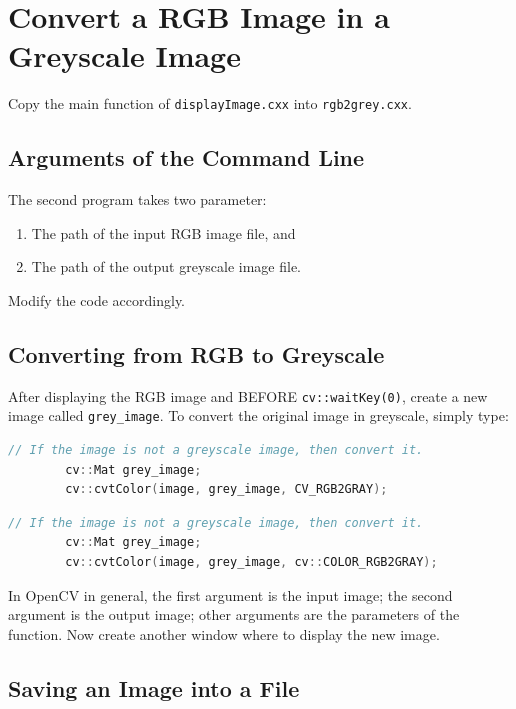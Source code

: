 \documentclass[english,a4paper,12pt,oneside]{article}
\begin{document}
\section{Convert a RGB Image in a Greyscale Image}

Copy the main function of \verb+displayImage.cxx+ into \verb+rgb2grey.cxx+.

\subsection{Arguments of the Command Line}

The second program takes two parameter:
\begin{enumerate}
 \item  The path of the input RGB image file, and
 \item  The path of the output greyscale image file.
\end{enumerate}
Modify the code accordingly. 


\subsection{Converting from RGB to Greyscale}

After displaying the RGB image and BEFORE \verb+cv::waitKey(0)+, create a new image called \verb+grey_image+. 
To convert the original image in greyscale, simply type:
\begin{lstlisting}[language=c++,caption=Convert the colour model of the image in OpenCV2 and 3.]
        // If the image is not a greyscale image, then convert it.
        cv::Mat grey_image;
        cv::cvtColor(image, grey_image, CV_RGB2GRAY);
\end{lstlisting}

\begin{lstlisting}[language=c++,caption=Convert the colour model of the image in OpenCV4.]
        // If the image is not a greyscale image, then convert it.
        cv::Mat grey_image;
        cv::cvtColor(image, grey_image, cv::COLOR_RGB2GRAY);
\end{lstlisting}

In OpenCV in general, the first argument is the input image; the second argument is the output image; other arguments are the parameters of the function. 
Now create another window where to display the new image. 

\subsection{Saving an Image into a File}
\end{document}
